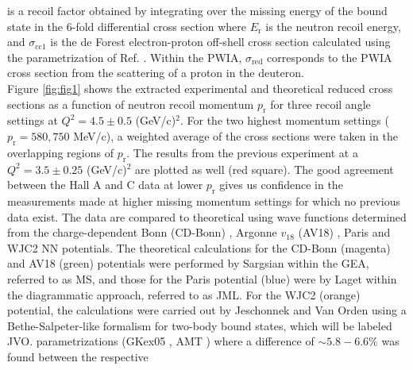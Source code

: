 is a recoil factor obtained by integrating over the missing energy of the bound state in the 6-fold differential cross section where $E_{\mathrm{r}}$ is the neutron recoil energy, and $\sigma_{\mathrm{cc1}}$ is the
de Forest \cite{DEFOREST1983} electron-proton off-shell cross section calculated using the \DIFdelbegin {}\DIFdelend \DIFaddbegin {}\DIFaddend parametrization of Ref. \cite{PhysRevC.69.022201}.
Within the PWIA, $\sigma_{\mathrm{red}}$ corresponds to the PWIA cross section from the scattering of a proton in the deuteron. \\
\indent Figure \ref{fig:fig1} shows the extracted experimental and theoretical reduced cross sections as a function of neutron recoil momentum
$p_{\mathrm{r}}$ for three recoil angle settings at $Q^{2}=4.5\pm0.5$ (GeV/c)$^{2}$. For the two highest momentum settings ($p_{\mathrm{r}}=580, 750$ MeV/c), a weighted average of the cross sections were taken in the overlapping regions of $p_{\mathrm{r}}$. The results from the previous experiment \cite{PhysRevLett.107.262501} at a $Q^{2}=3.5\pm0.25$ (GeV/c)$^{2}$ are plotted as well (red square). The good agreement between the Hall A and C data at lower $p_{\mathrm{r}}$
gives us confidence in the measurements made at higher missing momentum settings for which no previous data exist.
The data are compared to theoretical \DIFdelbegin {}\DIFdelend \DIFaddbegin {}\DIFaddend using wave functions determined from the charge-dependent Bonn (CD-Bonn) \cite{PhysRevC.63.024001}, Argonne $v_{18}$ (AV18) \cite{PhysRevC.51.38}, Paris \cite{PhysRevC.21.861} and WJC2 \cite{Gross_2007} NN potentials. The theoretical calculations
for the CD-Bonn (magenta) and AV18 (green) potentials were performed by Sargsian \cite{PhysRevC.82.014612} within the GEA, referred to as MS, and those for the Paris potential (blue) were by Laget \cite{LAGET2005} within the diagrammatic approach, referred to as JML.
For the WJC2 (orange) potential, the calculations were carried out by \DIFaddbegin {}\DIFaddend Jeschonnek and Van Orden \cite{PhysRevC.90.064006} using a Bethe-Salpeter-like formalism for two-body bound states, which will be labeled JVO.
\DIFdelbegin {}\DIFdelend %
\DIFaddbegin {}\DIFaddend parametrizations (GKex05 \cite{PhysRevC.66.045501}, AMT \cite{PhysRevC.76.035205}) where a difference of $\sim5.8-6.6 \%$ was found between the respective
